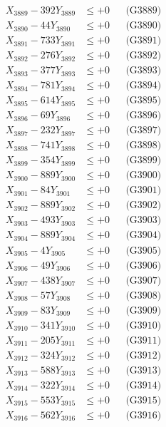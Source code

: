 \documentclass[a4paper,10pt]{article}
\begin{document}
{\begin{align}
X_{3889} - 392Y_{3889} &\leq +0 && \text{(G3889)} \\
X_{3890} - 44Y_{3890} &\leq +0 && \text{(G3890)} \\
\allowbreak
X_{3891} - 733Y_{3891} &\leq +0 && \text{(G3891)} \\
X_{3892} - 276Y_{3892} &\leq +0 && \text{(G3892)} \\
X_{3893} - 377Y_{3893} &\leq +0 && \text{(G3893)} \\
X_{3894} - 781Y_{3894} &\leq +0 && \text{(G3894)} \\
X_{3895} - 614Y_{3895} &\leq +0 && \text{(G3895)} \\
X_{3896} - 69Y_{3896} &\leq +0 && \text{(G3896)} \\
X_{3897} - 232Y_{3897} &\leq +0 && \text{(G3897)} \\
X_{3898} - 741Y_{3898} &\leq +0 && \text{(G3898)} \\
X_{3899} - 354Y_{3899} &\leq +0 && \text{(G3899)} \\
X_{3900} - 889Y_{3900} &\leq +0 && \text{(G3900)} \\
\allowbreak
X_{3901} - 84Y_{3901} &\leq +0 && \text{(G3901)} \\
X_{3902} - 889Y_{3902} &\leq +0 && \text{(G3902)} \\
X_{3903} - 493Y_{3903} &\leq +0 && \text{(G3903)} \\
X_{3904} - 889Y_{3904} &\leq +0 && \text{(G3904)} \\
X_{3905} - 4Y_{3905} &\leq +0 && \text{(G3905)} \\
X_{3906} - 49Y_{3906} &\leq +0 && \text{(G3906)} \\
X_{3907} - 438Y_{3907} &\leq +0 && \text{(G3907)} \\
X_{3908} - 57Y_{3908} &\leq +0 && \text{(G3908)} \\
X_{3909} - 83Y_{3909} &\leq +0 && \text{(G3909)} \\
X_{3910} - 341Y_{3910} &\leq +0 && \text{(G3910)} \\
\allowbreak
X_{3911} - 205Y_{3911} &\leq +0 && \text{(G3911)} \\
X_{3912} - 324Y_{3912} &\leq +0 && \text{(G3912)} \\
X_{3913} - 588Y_{3913} &\leq +0 && \text{(G3913)} \\
X_{3914} - 322Y_{3914} &\leq +0 && \text{(G3914)} \\
X_{3915} - 553Y_{3915} &\leq +0 && \text{(G3915)} \\
X_{3916} - 562Y_{3916} &\leq +0 && \text{(G3916)} \\

\end{align}}
\end{document}
